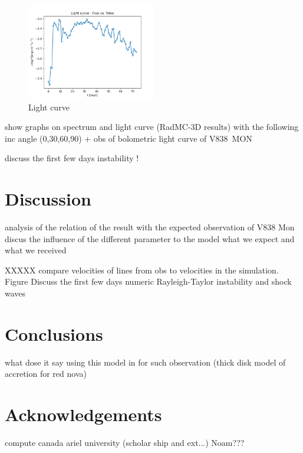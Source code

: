 \documentclass[a4paper,fleqn,usenatbib,useAMS]{mnras}
\begin{document}
\begin{figure}
    \begin{center}
        \includegraphics[width=0.5\textwidth]{light_curve.png}
    \end{center}
    \caption{
        Light curve
        }
    \label{fig:light-curve}
\end{figure}

show graphs on spectrum and light curve (RadMC-3D results) with the following inc angle (0,30,60,90) + obs of bolometric light curve of V838~MON

discuss the first few days instability !

\section{Discussion}
\label{sec:discuss}
analysis of the relation of the result with the expected observation of V838 Mon
discus the influence of the different parameter to the model
what we expect and what we received

XXXXX compare velocities of lines from obs to velocities in the simulation. Figure
Discuss the first few days numeric Rayleigh-Taylor instability and shock waves
\section{Conclusions}
\label{sec:concl}
what dose it say using this model in for such observation (thick disk model of accretion for red nova)


\section{Acknowledgements}
\label{sec:acknow}
compute canada
ariel university (scholar ship and ext...)
Noam???



\label{lastpage}
\end{document}
